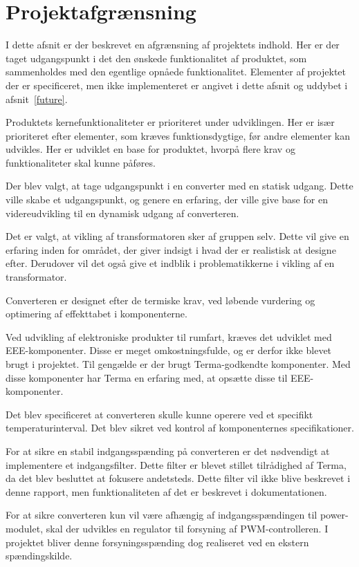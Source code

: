 
\chapter{Projektafgrænsning}
I dette afsnit er der beskrevet en afgrænsning af projektets indhold. Her er der taget udgangspunkt i det den ønskede funktionalitet af produktet, som sammenholdes med den egentlige opnåede funktionalitet. Elementer af projektet der er specificeret, men ikke implementeret er angivet i dette afsnit og uddybet i afsnit~\ref{future}. 

Produktets kernefunktionaliteter er prioriteret under udviklingen. Her er især prioriteret efter elementer, som kræves funktionsdygtige, før andre elementer kan udvikles. Her er udviklet en base for produktet, hvorpå flere krav og funktionaliteter skal kunne påføres.

Der blev valgt, at tage udgangspunkt i en converter med en statisk udgang. Dette ville skabe et udgangspunkt, og genere en erfaring, der ville give base for en videreudvikling til en dynamisk udgang af converteren.  

Det er valgt, at vikling af transformatoren sker af gruppen selv. Dette vil give en erfaring inden for området, der giver indsigt i hvad der er realistisk at designe efter. Derudover vil det også give et indblik i problematikkerne i vikling af en transformator. 

Converteren er designet efter de termiske krav, ved løbende vurdering og optimering af effekttabet i komponenterne.

Ved udvikling af elektroniske produkter til rumfart, kræves det udviklet med EEE-komponenter. Disse er meget omkostningsfulde, og er derfor ikke blevet brugt i projektet. Til gengælde er der brugt Terma-godkendte komponenter. Med disse komponenter har Terma en erfaring med, at opsætte disse til EEE-komponenter.  

Det blev specificeret at converteren skulle kunne operere ved et specifikt temperaturinterval. Det blev sikret ved kontrol af komponenternes specifikationer.

For at sikre en stabil indgangsspænding på converteren er det nødvendigt at implementere et indgangsfilter. Dette filter er blevet stillet tilrådighed af Terma, da det blev besluttet at fokusere andetsteds. Dette filter vil ikke blive beskrevet i denne rapport, men funktionaliteten af det er beskrevet i dokumentationen.

For at sikre converteren kun vil være afhængig af indgangsspændingen til power-modulet, skal der udvikles en regulator til forsyning af PWM-controlleren. I projektet bliver denne forsyningsspænding dog realiseret ved en ekstern spændingskilde. 




